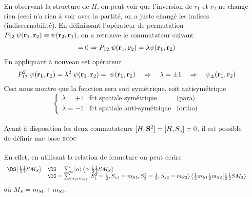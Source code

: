 En observant la structure de $H$, on peut voir que l'inversion de $r_1$ et $r_2$ ne change rien 
(ceci n'a rien à voir avec la partité, on a juste changé les indices (indiscernabilité). En 
définissant l'opérateur de permutation $P_{12} \; \psi ( {\bf r}_1, {\bf r}_2 ) \equiv  \psi ( {\bf r}
_2, {\bf r}_1 )$, on a retrouve le commutateur suivant
\begin{equation}
[ H, P_{12} ] = 0 \Rightarrow P_{12} \; \psi ( {\bf r}_1, {\bf r}_2 )
= \lambda \psi ( {\bf r}_1, {\bf r}_2 )
\end{equation}
En appliquant à nouveau cet opérateur
\begin{equation}
P_{12}^2 \; \psi ( {\bf r}_1, {\bf r}_2 ) = \lambda^2
\; \psi ( {\bf r}_1, {\bf r}_2 ) = \; \psi ( {\bf r}_1, {\bf r}_2 ) \quad \Rightarrow\quad
\lambda = \pm 1\quad\Rightarrow\quad \psi_{\pm} ( {\bf r}_1, {\bf r}_2 )
\end{equation}
Ceci nous montre que la fonction sera soit symétrique, soit antisymétrique
\begin{equation}
\left\{ 
\begin{array}{lll}
\lambda = +1 & \mbox{fct spatiale sym\'etrique} & \mbox{(para)} \\
\lambda = -1 & \mbox{fct spatiale anti-sym\'etrique} & \mbox{(ortho)} 
\end{array}
\right.
\end{equation}\ \\

Ayant à disposition les deux commutateurs $[H, {\bf S}^2 ] = [H, S_z ] = 0$, il est possible de 
définir une base \textsc{ecoc} \ \\

\ \\

En effet, en utilisant la relation de fermeture on peut écrire
\begin{equation}
\begin{array}{ll}
\DS\ket{\frac{1}{2}\frac{1}{2}SM_S} &\DS= \sum_\alpha \ket{\alpha}\bra{\alpha}\ket{\frac{1}{2}\frac{1}
{2}SM_S}\\
&\DS= \sum_{m_{S1}m_{S2}} \ket{S_1^2 = \frac{1}{2}, S_{z1} = m_{S1}, S_2^2 = \frac{1}{2}, S_{z2} = m_{S2}}\bra{\frac{1}{2}m_{S1}\frac{1}{2}m_{S2}}\ket{\frac{1}{2}\frac{1}{2}SM_2}
\end{array}
\end{equation}
où $M_S=m_{S1}+m_{S2}$.\\

